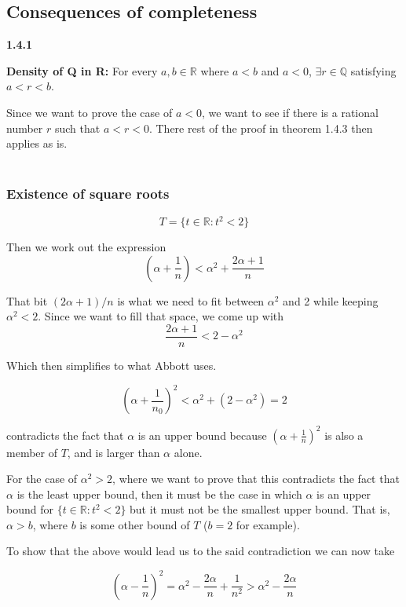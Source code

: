 \subsection{Consequences of completeness}


\textbf{1.4.1}

\textbf{Density of Q in R:} For every $a,b \in \mathbb{R}$ where $a < b$ and $a<0$, $\exists r \in \mathbb{Q}$
satisfying $a < r < b$.

Since we want to prove the case of $a<0$, we want to see if there is a rational number $r$ such that $a < r < 0$.
There rest of the proof in theorem 1.4.3 then applies as is.
\\~\\


\subsubsection{Existence of square roots}

$$
T = \{ t\in\mathbb{R} : t^2 < 2 \}
$$

Then we work out the expression
$$
\left( \alpha + \frac{1}{n} \right) < \alpha^2 + \frac{2\alpha + 1}{n}
$$

That bit $(2\alpha + 1)/n$ is what we need to fit between $\alpha^2$ and 2 while keeping $\alpha^2 <2$.
Since we want to fill that space, we come up with
$$
\frac{2\alpha + 1}{n} < 2 - \alpha^2
$$

Which then simplifies to what Abbott uses.


$$
\left( \alpha + \frac{1}{n_0} \right)^2 < \alpha^2 + (2 - \alpha^2) = 2
$$

contradicts the fact that $\alpha$ is an upper bound because $(\alpha + \frac{1}{n})^2$ is also a member of
$T$, and is larger than $\alpha$ alone.

For the case of $\alpha^2 > 2$, where we want to prove that this contradicts the fact that $\alpha$ is the least upper bound,
then it must be the case in which $\alpha$ is an upper bound for $\{ t \in \mathbb{R} : t^2 < 2 \}$ but it must not be
the smallest upper bound.
That is, $\alpha > b$, where $b$ is some other bound of $T$ ($b=2$ for example).

To show that the above would lead us to the said contradiction we can now take

$$
\left( \alpha - \frac{1}{n} \right)^2 =
    \alpha^2 - \frac{2\alpha}{n} + \frac{1}{n^2} >
    \alpha^2 - \frac{2\alpha}{n}
$$

